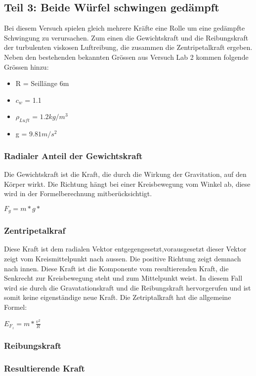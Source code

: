 \documentclass[../main.tex]{subfiles}
\begin{document}
\subsection{Teil 3: Beide Würfel schwingen gedämpft}
Bei diesem Versuch spielen gleich mehrere Kräfte eine Rolle um eine gedämpfte Schwingung zu verursachen. Zum einen die Gewichtskraft und die Reibungskraft der turbulenten viskosen Luftreibung, die zusammen die Zentripetalkraft ergeben.
Neben den bestehenden bekannten Grössen aus Versuch Lab 2 kommen folgende Grössen hinzu:
\begin{itemize}
	\item R = Seillänge 6m
	\item $c_w$ = 1.1
	\item $\rho_{Luft}$ = $1.2kg/m^3$
	\item g = $9.81 m/s^2$
	
\end{itemize}
\subsubsection{Radialer Anteil der Gewichtskraft}
Die Gewichtskraft ist die Kraft, die durch die Wirkung der Gravitation, auf den Körper wirkt. Die Richtung hängt bei einer Kreisbewegung vom Winkel ab, diese wird in der Formelberechnung mitberücksichtigt.
\begin{mdframed}
$F_g = m * g *$
\end{mdframed}
\subsubsection{Zentripetalkraf}
Diese Kraft ist dem radialen Vektor entgegengesetzt,vorausgesetzt dieser Vektor zeigt vom Kreismittelpunkt nach aussen. Die positive Richtung zeigt demnach nach innen. Diese Kraft ist die Komponente vom resultierenden Kraft, die Senkrecht zur Kreisbewegung steht und zum Mittelpunkt weist. In diesem Fall wird sie durch die Gravatationskraft und die Reibungskraft hervorgerufen und ist somit keine eigenständige neue Kraft.
Die Zetriptalkraft hat die allgemeine Formel:
\begin{mdframed}
$E_{F_z}=m * \frac{v^2}{R} $
\end{mdframed}

\subsubsection{Reibungskraft}
\subsubsection{Resultierende Kraft}
\end{document}
